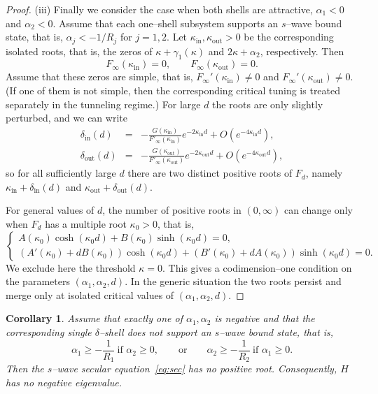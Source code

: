 \documentclass[a4paper,11pt]{article}
\numberwithin{equation}{section}
\newtheorem{cor}[thm]{Corollary}
\theoremstyle{definition}
\theoremstyle{remark}
\begin{document}
\begin{proof}
\smallskip
\noindent
(iii) Finally we consider the case when both shells are attractive,
$\alpha_1<0$ and $\alpha_2<0$.
Assume that each one--shell subsystem supports an $s$--wave bound state, that is,
$\alpha_j<-1/R_j$ for $j=1,2$.
Let $\kappa_{\mathrm{in}},\kappa_{\mathrm{out}}>0$ be the corresponding isolated
roots, that is, the zeros of $\kappa+\gamma_1(\kappa)$ and $2\kappa+\alpha_2$,
respectively.
Then
$$
F_\infty(\kappa_{\mathrm{in}})=0,\qquad F_\infty(\kappa_{\mathrm{out}})=0.
$$
Assume that these zeros are simple, that is,
$F_\infty'(\kappa_{\mathrm{in}})\ne0$ and $F_\infty'(\kappa_{\mathrm{out}})\ne0$.
(If one of them is not simple, then the corresponding critical tuning is treated
separately in the tunneling regime.)
For large $d$ the roots are only slightly perturbed, and we can write
\begin{eqnarray}
\delta_{\mathrm{in}}(d)&=&-\frac{G(\kappa_{\mathrm{in}})}{F'_\infty(\kappa_{\mathrm{in}})}e^{-2\kappa_{\mathrm{in}}d}
+O(e^{-4\kappa_{\mathrm{in}}d}),\nonumber\\
\delta_{\mathrm{out}}(d)&=&-\frac{G(\kappa_{\mathrm{out}})}{F'_\infty(\kappa_{\mathrm{out}})}e^{-2\kappa_{\mathrm{out}}d}
+O(e^{-4\kappa_{\mathrm{out}}d}),\nonumber
\end{eqnarray}
so for all sufficiently large $d$ there are two distinct positive roots of $F_d$,
namely $\kappa_{\mathrm{in}}+\delta_{\mathrm{in}}(d)$ and
$\kappa_{\mathrm{out}}+\delta_{\mathrm{out}}(d)$.

For general values of $d$, the number of positive roots in $(0,\infty)$ can
change only when $F_d$ has a multiple root $\kappa_0>0$, that is,
\begin{equation}\label{eq:double-root-new}
\begin{cases}
A(\kappa_0)\cosh(\kappa_0d)+B(\kappa_0)\sinh(\kappa_0d)=0,\\
(A'(\kappa_0)+dB(\kappa_0))\cosh(\kappa_0d)
+(B'(\kappa_0)+dA(\kappa_0))\sinh(\kappa_0d)=0.
\end{cases}
\end{equation}
We exclude here the threshold $\kappa=0$.
This gives a codimension--one condition on the parameters $(\alpha_1,\alpha_2,d)$.
In the generic situation the two roots persist and merge only at isolated
critical values of $(\alpha_1,\alpha_2,d)$.
\end{proof}

\begin{cor}\label{cor:no-bound-fixed}
Assume that exactly one of $\alpha_1,\alpha_2$ is negative and that the
corresponding single $\delta$--shell does not support an $s$--wave bound state,
that is,
$$
  \alpha_1 \ge -\frac{1}{R_1}\ \text{if }\alpha_2\ge0,
  \qquad\text{or}\qquad
  \alpha_2 \ge -\frac{1}{R_2}\ \text{if }\alpha_1\ge0.
$$
Then the $s$--wave secular equation~\eqref{eq:sec} has no positive root.
Consequently, $H$ has no negative eigenvalue.
\end{cor}
\end{document}
